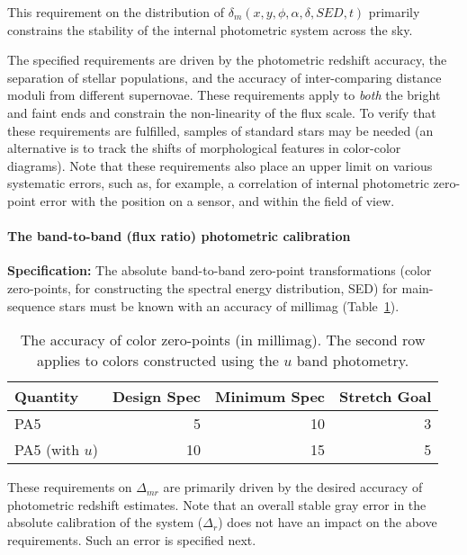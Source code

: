 This requirement on the distribution of $\delta_m(x,y,\phi,\alpha,\delta,SED,t)$
primarily constrains the stability of the internal photometric system
across the sky.

The specified requirements are driven by the photometric redshift accuracy,
the separation of stellar populations, and the accuracy of inter-comparing
distance moduli from different supernovae. These requirements apply
to {\it both} the bright and faint ends and constrain the non-linearity of the
flux scale. To verify that these requirements are
fulfilled, samples of standard stars may be needed (an alternative is to
track the shifts of morphological features in color-color diagrams).
Note that these requirements also place an upper limit on various systematic
errors, such as, for example, a correlation of internal photometric
zero-point error with the position on a sensor, and within the field of
view.


\paragraph{The band-to-band (flux ratio) photometric calibration\\}

{\bf Specification:} The absolute band-to-band zero-point transformations
(color zero-points, \eg for constructing the spectral energy distribution,
SED) for main-sequence stars must be known with an accuracy of
millimag (Table~\ref{TcolorOffsets}).

\begin{table}[h]
\begin{tabular}{|l|r|r|r|}
\hline
              Quantity   & Design Spec & Minimum Spec & Stretch Goal   \\
\hline
      PA5                &       5     &       10     &    3            \\
      PA5 (with $u$)     &      10     &       15     &    5            \\
\hline
\end{tabular}
\caption{The accuracy of color zero-points (in millimag). The second row
applies to colors constructed using the $u$ band photometry.}
\label{TcolorOffsets}
\end{table}

These requirements on $\Delta_{mr}$ are primarily driven by the desired accuracy of
photometric redshift estimates. Note that an overall stable gray error in
the absolute calibration of the system ($\Delta_r$) does not have an impact
on the above requirements. Such an error is specified next.



